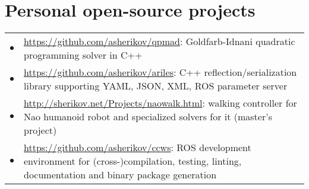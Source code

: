 \documentclass[a4paper,10pt]{report}
\begin{document}
\section{Personal open-source projects}
\begin{adjustwidth}{0.5cm}{0pt}
    \begin{tabularx}{\linewidth}{l X}
        \hfill $\bullet$    &   \href{https://github.com/asherikov/qpmad}{https://github.com/asherikov/qpmad}:
                                Goldfarb-Idnani quadratic programming solver in C++ \\

        \hfill $\bullet$    &   \href{https://github.com/asherikov/ariles}{https://github.com/asherikov/ariles}:
                                C++ reflection/serialization library supporting YAML, JSON, XML, ROS parameter server \\

        \hfill $\bullet$    &   \href{http://sherikov.net/Projects/naowalk.html}
                                {http://sherikov.net/Projects/naowalk.html}: walking controller for Nao
                                humanoid robot and specialized solvers for it (master's project) \\

        \hfill $\bullet$    &   \href{https://github.com/asherikov/ccws}{https://github.com/asherikov/ccws}:
                                ROS development environment for (cross-)compilation, testing, linting,
                                documentation and binary package generation
    \end{tabularx}
\end{adjustwidth}


\vspace{0.15cm}
\end{document}
